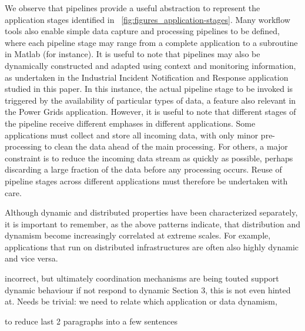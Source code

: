 \documentclass[times]{cpeauth}
\newcommand{\jhanote}[1]{ {\textcolor{blue} { ***Shantenu: #1 }}}
\begin{document}
{We observe that pipelines provide a useful abstraction to represent the
application stages identified in
\figurename~\ref{fig:figures_application-stages}.  Many workflow tools also
enable simple data capture and processing pipelines to be defined, where each
pipeline stage may range from a complete application to a subroutine in Matlab
(for instance).  It is useful to note that pipelines may also be dynamically
constructed and adapted using context and monitoring information, as undertaken
in the Industrial Incident Notification and Response application studied in this
paper. In this instance, the actual pipeline stage to be invoked is triggered by
the availability of particular types of data, a feature also relevant in the
Power Grids application.  However, it is useful to note that different stages of
the pipeline receive different emphases in different applications. Some
applications must collect and store all incoming data, with only minor
pre-processing to clean the data ahead of the main processing. For others, a
major constraint is to reduce the incoming data stream as quickly as possible,
perhaps discarding a large fraction of the data before any processing
occurs. Reuse of pipeline stages across different applications must therefore be
undertaken with care.


Although dynamic and distributed properties have been characterized separately,
it is important to remember, as the above patterns indicate, that distribution
and dynamism become increasingly correlated at extreme scales.  For example,
applications that run on distributed infrastructures are often also highly
dynamic and vice versa.




incorrect, but ultimately coordination mechanisms are being touted %
support dynamic behaviour if not respond to dynamic %
Section 3, this is not even hinted at. Needs %
be trivial: we need to relate which %
application or data dynamism, %


to reduce last 2 paragraphs into a few sentences}
\end{document}

